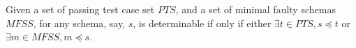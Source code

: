 %
%
%
%
%
%
%
%
%
%
%
%



\begin{proposition}\label{pro:determinableparthealthyfaulty}
Given a set of passing test case set $PTS$, and a set of minimal faulty schemas $MFSS$, for any schema, say, $s$, is determinable if only if either $\exists t \in PTS, s \preceq t$ or $\exists m \in MFSS, m \preceq s$.
\end{proposition}

